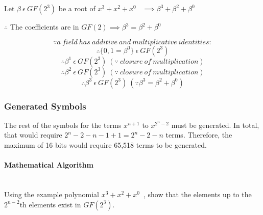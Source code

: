 \documentclass[11pt]{extarticle}
\newcommand{\examplepoly}{$x^{3}+x^{2}+x^{0}$}
\begin{document}
                \hspace*{\fill}
                \centerline{Let $\beta \ \epsilon \ GF(2^{3})$ be a root of
                \examplepoly~ $\implies \beta^{3}+\beta^{2}+\beta^{0}$}

                \hspace*{\fill}
                \centerline{$\therefore$ The coefficients are in $GF(2)
                \implies
                \beta^{3}=\beta^{2}+\beta^{0}$}
                \[ \because a \ field \ has \ additive \ and \ multiplicative \
                identities: \]
                \[ \therefore \{ 0, 1=\beta^{0} \} \ \epsilon \ GF(2^{3}) \]
                \[ \therefore \beta^{1} \ \epsilon \ GF(2^{3}) \ (\because \
                closure \ of \ multiplication) \]
                \[ \therefore \beta^{2} \ \epsilon \ GF(2^{3}) \ (\because \
                closure \ of \ multiplication) \]
                \[ \therefore \beta^{3} \ \epsilon \ GF(2^{3}) \ (\because
                \beta^{3}=\beta^{2}+\beta^{0}) \]

            \newpage

            \subsubsection{Generated Symbols} The rest of the symbols for the
            terms $x^{n+1}$ to $x^{2^{n}-2}$ must be generated. In total, that
            would require $2^{n}-2-n-1+1=2^{n}-2-n$ terms. Therefore, the
            maximum of 16 bits would require 65,518 terms to be generated.

                \paragraph{Mathematical Algorithm} \leavevmode \\ Using the
                example polynomial \examplepoly~, show that the elements up to
                the $2^{n-2}$th elements exist in $GF(2^{3})$.
\end{document}
